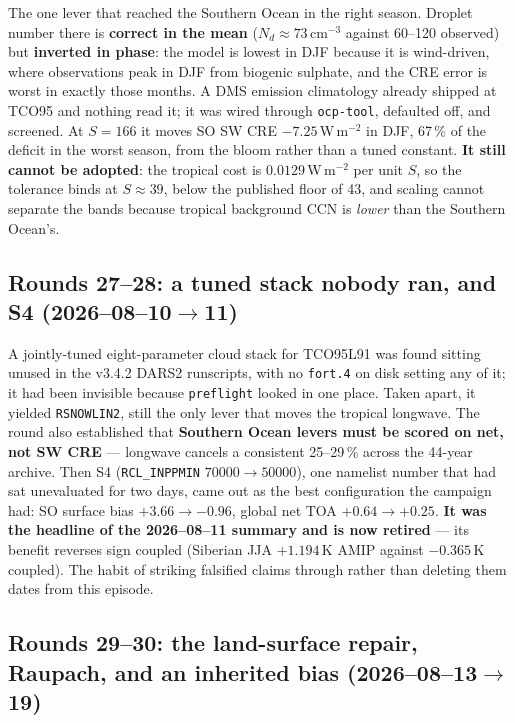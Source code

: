 \documentclass[10pt]{article}
\begin{document}
The one lever that reached the Southern Ocean in the right season. Droplet number there is
\textbf{correct in the mean} ($N_d\approx73$\,cm$^{-3}$ against 60--120 observed) but
\textbf{inverted in phase}: the model is lowest in DJF because it is wind-driven, where
observations peak in DJF from biogenic sulphate, and the CRE error is worst in exactly those
months. A DMS emission climatology already shipped at TCO95 and nothing read it; it was
wired through \texttt{ocp-tool}, defaulted off, and screened. At $S=166$ it moves SO SW CRE
$-7.25$\,W\,m$^{-2}$ in DJF, 67\,\% of the deficit in the worst season, from the bloom
rather than a tuned constant. \textbf{It still cannot be adopted}: the tropical cost is
$0.0129$\,W\,m$^{-2}$ per unit $S$, so the tolerance binds at $S\approx39$, below the
published floor of 43, and scaling cannot separate the bands because tropical background CCN
is \emph{lower} than the Southern Ocean's.

\subsection{Rounds 27--28: a tuned stack nobody ran, and S4 (2026--08--10$\to$11)}

A jointly-tuned eight-parameter cloud stack for TCO95L91 was found sitting unused in the
v3.4.2 DARS2 runscripts, with no \texttt{fort.4} on disk setting any of it; it had been
invisible because \texttt{preflight} looked in one place. Taken apart, it yielded
\texttt{RSNOWLIN2}, still the only lever that moves the tropical longwave. The round also
established that \textbf{Southern Ocean levers must be scored on net, not SW CRE} ---
longwave cancels a consistent 25--29\,\% across the 44-year archive. Then S4
(\texttt{RCL\_INPPMIN} $70000\to50000$), one namelist number that had sat unevaluated for
two days, came out as the best configuration the campaign had: SO surface bias
$+3.66\to-0.96$, global net TOA $+0.64\to+0.25$. \textbf{It was the headline of the
2026--08--11 summary and is now retired} --- its benefit reverses sign coupled (Siberian JJA
$+1.194$\,K AMIP against $-0.365$\,K coupled). The habit of striking falsified claims through
rather than deleting them dates from this episode.

\subsection{Rounds 29--30: the land-surface repair, Raupach, and an inherited bias
(2026--08--13$\to$19)}
\end{document}
